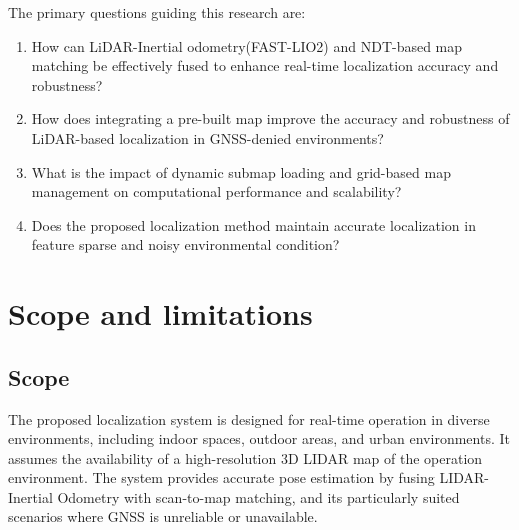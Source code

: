 The primary questions guiding this research are:
\begin{enumerate}
	\item How can LiDAR-Inertial odometry(FAST-LIO2) and NDT-based map matching be effectively fused to enhance real-time localization accuracy and robustness?
    \item How does integrating a pre-built map improve the accuracy and robustness of LiDAR-based localization in GNSS-denied environments?
    
    \item What is the impact of dynamic submap loading and grid-based map management on computational performance and scalability?
    
    \item Does the proposed localization method     maintain accurate localization in feature sparse and noisy environmental condition?
    
\end{enumerate}
\section{Scope and limitations}
\subsection{Scope}
The proposed localization system is designed for real-time operation in diverse environments, including indoor spaces, outdoor areas, and urban environments. It assumes the availability of a high-resolution 3D LIDAR map of the operation environment. The system provides accurate pose estimation by fusing LIDAR-Inertial Odometry with scan-to-map matching, and its particularly suited scenarios where GNSS is unreliable or unavailable.
